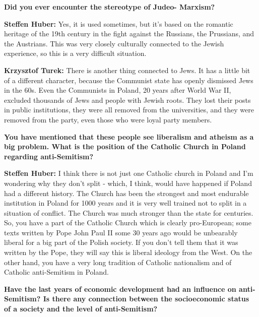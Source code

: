 \textbf{Did you ever encounter the stereotype of Judeo- Marxism?} 

\textbf{Steffen Huber:} Yes, it is used sometimes, but it's based on the romantic heritage of the 19th century in the fight against the Russians, the Prussians, and the Austrians. This was very closely culturally connected to the Jewish experience, so this is a very difficult situation.\par
\textbf{Krzysztof Turek:} There is another thing connected to Jews. It has a little bit of a different character, because the Communist state has openly dismissed Jews in the 60s. Even the Communists in Poland, 20 years after World War II, excluded thousands of Jews and people with Jewish roots. They lost their posts in public institutions, they were all removed from the universities, and they were removed from the party, even those who were loyal party members. 

\textbf{You have mentioned that these people see liberalism and atheism as a big problem. What is the position of the Catholic Church in Poland regarding anti-Semitism?} 

\textbf{Steffen Huber:} I think there is not just one Catholic church in Poland and I'm wondering why they don't split - which, I think, would have happened if Poland had a different history. The Church has been the strongest and most endurable institution in Poland for 1000 years and it is very well trained not to split in a situation of conflict. The Church was much stronger than the state for centuries. So, you have a part of the Catholic Church which is clearly pro-European; some texts written by Pope John Paul II some 30 years ago would be unbearably liberal for a big part of the Polish society. If you don't tell them that it was written by the Pope, they will say this is liberal ideology from the West. On the other hand, you have a very long tradition of Catholic nationalism and of Catholic anti-Semitism in Poland. 

\textbf{Have the last years of economic development had an influence on anti-Semitism? Is there any connection between the socioeconomic status of a society and the level of anti-Semitism?} 

